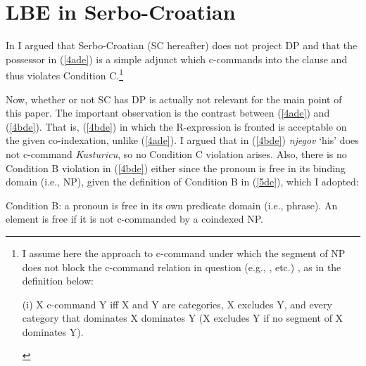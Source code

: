 \documentclass[output=paper]{langscibook}
\begin{document}
\section{LBE in Serbo-Croatian } \label{s2de}

In \citet{Despic2011,Despic2013} I argued that Serbo-Croatian (SC hereafter) does not project DP and that the possessor in (\ref{4ade}) is a simple adjunct which c-commands into the clause and thus violates Condition C.\footnote{I assume here the approach to c-command under which the segment of NP does not block the c-command relation in question (e.g., \citeauthor{kayne1994}, \citeauthor{Despic2011} \citeyear{Despic2011} etc.) , as in the definition below:
\begin{exe}
\ex (i)	X c-command Y iff X and Y are categories, X excludes Y, and every category that dominates X dominates Y (X excludes Y if no segment of X dominates Y).  
\end{exe}}

\begin{exe}
\judgewidth{\cmark}
\ex \label{4de}
\begin{xlist}
\end{xlist}
\end{exe}

Now, whether or not SC has DP is actually not relevant for the main point of this paper. The important observation is the contrast between (\ref{4ade}) and (\ref{4bde}). That is, (\ref{4bde}) in which the R-expression is fronted is acceptable on the given co-indexation, unlike (\ref{4ade}). I argued that in (\ref{4bde}) \textit{njegov} ‘his’ does not c-command \textit{Kusturicu}, so no Condition C violation arises. Also, there is no Condition B violation in (\ref{4bde}) either since the pronoun is free in its binding domain (i.e., NP), given the definition of Condition B in (\ref{5de}), which I adopted:

\begin{exe}
\ex \label{5de}
Condition B: a pronoun is free in its own predicate domain (i.e., phrase). An element is free if it is not c-commanded by a coindexed NP.
\end{exe}
\end{document}
